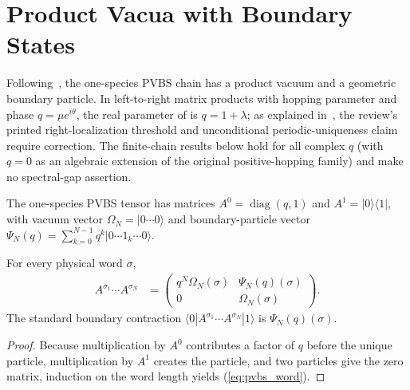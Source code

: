 \section{Product Vacua with Boundary States}
\label{sec:examples_pvbs}

Following~\cite[Section~II, equations~(1)--(8)]{BachmannNachtergaele2012PVBS},
the one-species PVBS chain has a product vacuum and a geometric boundary
particle. In left-to-right matrix products with hopping parameter and phase
$q=\mu e^{i\theta}$, the real parameter of
\cite[Section~IV.C.4]{Cirac2021Matrix} is $q=1+\lambda$; as explained
in~\cite{gap:cpgsv21_pvbs_threshold}, the review's printed right-localization
threshold and unconditional periodic-uniqueness claim require correction. The
finite-chain results below hold for all complex $q$ (with $q=0$ as an
algebraic extension of the original positive-hopping family) and make no
spectral-gap assertion.

\begin{definition}
    \label{def:pvbs_tensor}
    \leanok
    The one-species PVBS tensor has matrices $A^0=\operatorname{diag}(q,1)$
    and $A^1=|0\rangle\langle1|$, with vacuum vector
    $\Omega_N=|0\cdots0\rangle$ and boundary-particle vector
    $\Psi_N(q)=\sum_{k=0}^{N-1}q^k|0\cdots1_k\cdots0\rangle$.
\end{definition}

\begin{lemma}
    \label{lem:pvbs_amplitudes}
    \leanok
    For every physical word $\sigma$,
    \begin{align}
        A^{\sigma_1}\cdots A^{\sigma_N}
         & =\begin{pmatrix}
                q^N\Omega_N(\sigma) & \Psi_N(q)(\sigma) \\
                0                   & \Omega_N(\sigma)
            \end{pmatrix}.
        \label{eq:pvbs_word}
    \end{align}
    The standard boundary contraction $\langle0|A^{\sigma_1}\cdots
        A^{\sigma_N}|1\rangle$ is $\Psi_N(q)(\sigma)$.
\end{lemma}
\begin{proof}
    \leanok
    Because multiplication by $A^0$ contributes a factor of $q$ before the
    unique particle, multiplication by $A^1$ creates the particle, and two
    particles give the zero matrix, induction on the word length yields
    (\ref{eq:pvbs_word}).
\end{proof}

